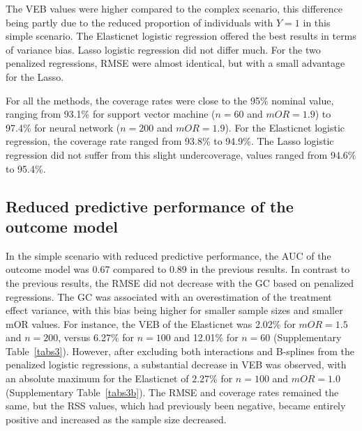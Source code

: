 \documentclass{article}
\begin{document}
The VEB values were higher compared to the complex scenario, this difference being partly due to the reduced proportion of individuals with $Y=1$ in this simple scenario.
The Elasticnet logistic regression offered the best results in terms of variance bias. Lasso logistic regression did not differ much. For the two penalized regressions, RMSE were almost identical, but with a small advantage for the Lasso.


For all the methods, the coverage rates were close to the 95\% nominal value, ranging from 93.1\% for support vector machine ($n=60$ and $mOR = 1.9$) to 97.4\% for neural network ($n=200$ and $mOR = 1.9$). For the Elasticnet logistic regression, the coverage rate ranged from 93.8\% to 94.9\%. The Lasso logistic regression did not suffer from this slight undercoverage, values ranged from 94.6\% to 95.4\%.










\subsection{Reduced predictive performance of the outcome model}\label{s1s-bis}
In the simple scenario with reduced predictive performance, the AUC of the outcome model was 0.67 compared to 0.89 in the previous results. In contrast to the previous results, the RMSE did not decrease with the GC based on penalized regressions. The GC was associated with an overestimation of the treatment effect variance, with this bias being higher for smaller sample sizes and smaller mOR values. For instance, the VEB of the Elasticnet was 2.02\% for $mOR=1.5$ and $n=200$, versus 6.27\% for $n=100$ and 12.01\% for $n=60$ (Supplementary Table~\ref{tabs3}). However, after excluding both interactions and B-splines from the penalized logistic regressions, a substantial decrease in VEB was observed, with an absolute maximum for the Elasticnet of $2.27\%$ for $n=100$ and $mOR=1.0$ (Supplementary Table~\ref{tabs3b}). The RMSE and coverage rates remained the same, but the RSS values, which had previously been negative, became entirely positive and increased as the sample size decreased.
\end{document}
